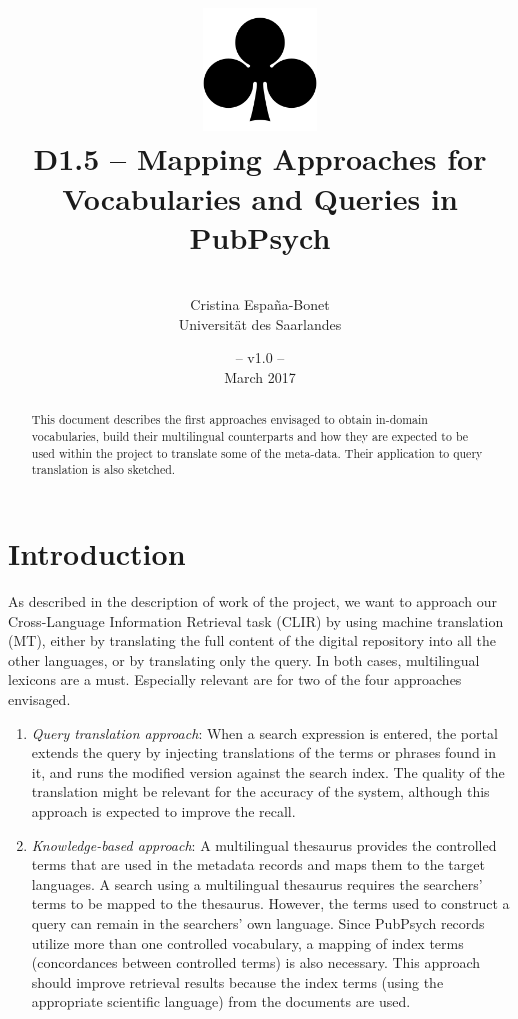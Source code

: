 \documentclass[a4paper,11pt]{article}
\title{
\includegraphics[width=3cm]{./img/200px-SuitClubs.png} \\
\Huge D1.5 -- Mapping Approaches for \\ Vocabularies and Queries in PubPsych }
\author{\vspace*{1cm}\\ \LARGE Cristina Espa\~na-Bonet \medskip \\ \Large Universit\"at des Saarlandes}
\date{\vspace*{2cm} -- v1.0 --\\March 2017}
\begin{document}
\clearpage\maketitle
\thispagestyle{empty}\thispagestyle{empty}

\vspace*{5cm}
\begin{abstract}
This document describes the first approaches envisaged to obtain in-domain vocabularies, build their multilingual counterparts and how they are expected to be used within the project to translate some of the meta-data. Their application to query translation is also sketched. 
\end{abstract}

\newpage
\tableofcontents
\clearpage


\section{Introduction}
\label{s:intro}

As described in the description of work of the project, we want to approach our Cross-Language Information Retrieval task (CLIR) by using machine translation (MT), either by translating the full content of the digital repository into all the other languages, or by translating only the query. In both cases, multilingual lexicons are a must. Especially relevant are for two of the four approaches envisaged. 

\begin{enumerate}
 \item \emph{Query translation approach}: When a search expression is entered, the portal extends the query by injecting translations of the terms or phrases found in it, and runs the modified version against the search index. The quality of the translation might be relevant for the accuracy of the system, although this approach is expected to improve the recall.

 \item \emph{Knowledge-based approach}: A multilingual thesaurus provides the controlled terms that are used in the metadata records and maps them to the target languages. A search using a multilingual thesaurus requires the searchers' terms to be mapped to the thesaurus. However, the terms used to construct a query can remain in the searchers' own language. Since PubPsych records utilize more than one controlled vocabulary, a mapping of index terms (concordances between controlled terms) is also necessary. This approach should improve retrieval results because the index terms (using the appropriate scientific language) from the documents are used. 
\end{enumerate}
\end{document}
